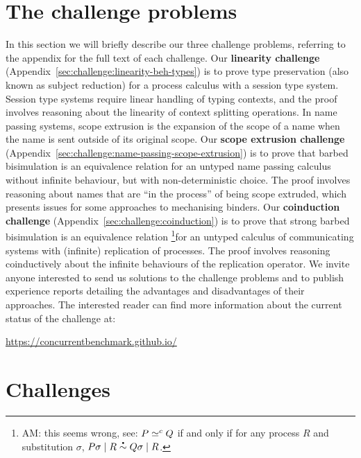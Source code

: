 \documentclass[runningheads]{llncs}
\begin{document}
\section{The challenge problems}
In this section we will briefly describe our three challenge problems, referring to the appendix for the full text of each challenge.
Our \textbf{linearity challenge} (Appendix~\ref{sec:challenge:linearity-beh-types}) is to prove type preservation (also known as subject reduction) for a process calculus with a session type system.
Session type systems require linear handling of typing contexts, and the proof involves reasoning about the linearity of context splitting operations.
In name passing systems, scope extrusion is the expansion of the scope of a name when the name is sent outside of its original scope.
Our \textbf{scope extrusion challenge} (Appendix~\ref{sec:challenge:name-passing-scope-extrusion}) is to prove that barbed bisimulation is an equivalence relation for an untyped name passing calculus without infinite behaviour, but with non-deterministic choice.
The proof involves reasoning about names that are ``in the process'' of being scope extruded, which presents issues for some approaches to mechanising binders.
Our \textbf{coinduction challenge} (Appendix~\ref{sec:challenge:coinduction}) is to prove that strong barbed bisimulation is an equivalence relation \footnote{AM: this seems wrong, see:  \( P \simeq^c Q \) if and only if for any process \( R \) and substitution \( \sigma \), \( \sbbisim{\Ppar{\applysubst{\sigma}{P}}{R}}{\Ppar{\applysubst{\sigma}{Q}}{R}} \).}for an untyped calculus of communicating systems with (infinite) replication of processes.
The proof involves reasoning coinductively about the infinite behaviours of the replication operator.
We invite anyone interested to send us solutions to the challenge problems and to publish experience reports detailing the advantages and disadvantages of their approaches.
The interested reader can find more information about the current status of the challenge at:
\begin{center}
  \url{https://concurrentbenchmark.github.io/}
\end{center}




\appendix
\section{Challenges}

\end{document}
